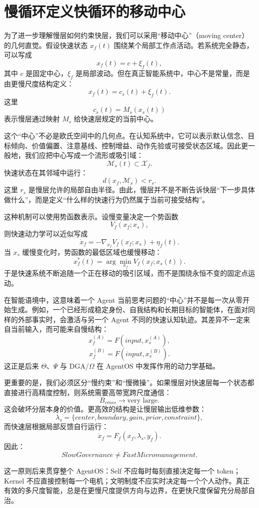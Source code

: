 \section{慢循环定义快循环的移动中心}

为了进一步理解慢层如何约束快层，我们可以采用“移动中心”（moving center）的几何直觉。假设快速状态 $x_f(t)$ 围绕某个局部工作点活动。若系统完全静态，可以写成
\[
x_f(t)
=
c+
\xi_f(t),
\]
其中 $c$ 是固定中心，$\xi_f$ 是局部波动。但在真正智能系统中，中心不是常量，而是由更慢尺度结构定义：
\[
x_f(t)
=
c_s(t)
+
\xi_f(t).
\]
这里
\[
c_s(t)
=
M_s(x_s(t))
\]
表示慢层通过映射 $M_s$ 给快速层规定的当前中心。

这个“中心”不必是欧氏空间中的几何点。在认知系统中，它可以表示默认信念、目标倾向、价值偏置、注意基线、控制增益、动作先验或可接受状态区域。因此更一般地，我们应把中心写成一个流形或吸引域：
\[
\mathcal{M}_s(t)
\subset
\mathcal{X}_f.
\]
快速状态在其邻域中运行：
\[
d
\left(
x_f,
\mathcal{M}_s
\right)
<
r_s.
\]
这里 $r_s$ 是慢层允许的局部自由半径。由此，慢层并不是不断告诉快层“下一步具体做什么”，而是定义“什么样的快速行为仍然属于当前可接受结构”。

这种机制可以使用势函数表示。设慢变量决定一个势函数
\[
V_f
\left(
x_f;x_s
\right),
\]
则快速动力学可以近似写成
\[
\dot{x}_f
=
-
\nabla_{x_f}
V_f
\left(
x_f;x_s
\right)
+
\eta_f(t).
\]
当 $x_s$ 缓慢变化时，势函数的最低区域也缓慢移动：
\[
x_f^{*}(t)
=
\arg\min_{x_f}
V_f
\left(
x_f;x_s(t)
\right).
\]
于是快速系统不断追随一个正在移动的吸引区域，而不是围绕永恒不变的固定点运动。

在智能语境中，这意味着一个 Agent 当前思考问题的“中心”并不是每一次从零开始生成。例如，一个已经形成稳定身份、自我结构和长期目标的智能体，在面对同样的外部事实时，会激活与另一个 Agent 不同的快速认知轨迹。其差异不一定来自当前输入，而可能来自慢结构：
\[
x_f^{(A)}
=
F
\left(
input,
x_s^{(A)}
\right),
\]
\[
x_f^{(B)}
=
F
\left(
input,
x_s^{(B)}
\right).
\]
这正是后来 $\Theta$、$\Psi$ 与 DGA/$\Omega$ 在 AgentOS 中发挥作用的动力学基础。

更重要的是，我们必须区分“慢约束”和“慢微操”。如果慢层对快速层每一个状态都直接进行高精度控制，则系统需要高带宽跨尺度通信：
\[
B_{cross}
\rightarrow
\text{very large}.
\]
这会破坏分层本身的价值。更高效的结构是让慢层输出低维参数：
\[
\lambda_s
=
\{
center,
boundary,
gain,
prior,
constraint
\},
\]
而快速层根据局部反馈自行运行：
\[
\dot{x}_f
=
F_f
\left(
x_f,
\lambda_s,
y_f
\right).
\]
因此：
\[
\boxed{
SlowGovernance
\neq
FastMicromanagement.
}
\]

这一原则后来贯穿整个 AgentOS：Self 不应每时每刻直接决定每一个 token；Kernel 不应直接控制每一个电机；文明制度不应实时决定每一个个人动作。真正有效的多尺度智能，总是在更慢尺度提供方向与边界，在更快尺度保留充分局部自治。

